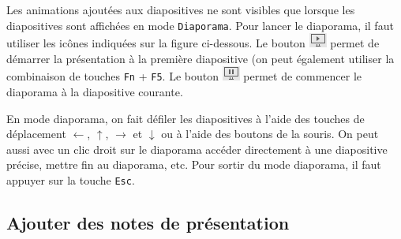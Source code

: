 \vspace{1em}

Les animations ajoutées aux diapositives ne sont visibles que lorsque les diapositives sont affichées en mode \texttt{Diaporama}. Pour lancer le diaporama, il faut utiliser les icônes indiquées sur la figure ci-dessous. Le bouton \includegraphics[width=.7cm]{./images/presentation/boutonDiaporamaPlay} permet de démarrer la présentation à la première diapositive (on peut également utiliser la combinaison de touches \texttt{Fn} + \texttt{F5}. Le bouton \includegraphics[width=.7cm]{./images/presentation/boutonDiaporamaPause} permet de commencer le diaporama à la diapositive courante.


En mode diaporama, on fait défiler les diapositives à l'aide des touches de déplacement $\leftarrow$, $\uparrow$, $\rightarrow$ et $\downarrow$ ou à l'aide des boutons de la souris. On peut aussi avec un clic droit sur le diaporama accéder directement à une diapositive précise, mettre fin au diaporama, etc. Pour sortir du mode diaporama, il faut appuyer sur la touche \texttt{Esc}.






\subsection{Ajouter des notes de présentation}\label{Presentation1notes}


